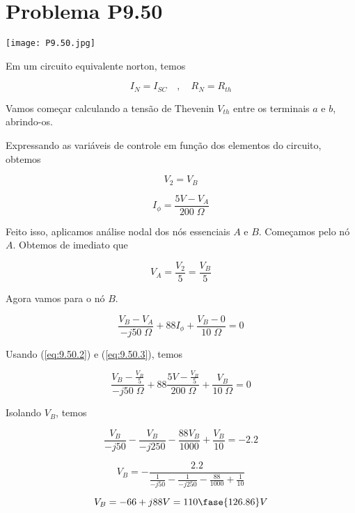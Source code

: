 \section*{Problema P9.50}

\renewcommand*\thesection{9.50}

\begin{center}
    \texttt{[image: P9.50.jpg]}
\end{center}

Em um circuito equivalente norton, temos

\[ I_N = I_{SC} \quad, \quad R_N = R_{th}  \]

Vamos começar calculando a tensão de Thevenin \(V_{th}\) entre os terminais \(a\) e \(b\), abrindo-os.

Expressando as variáveis de controle em função dos elementos do circuito, obtemos

\begin{equation}\label{eq:9.50.1}
    V_{2} = V_B
\end{equation}

\begin{equation}\label{eq:9.50.2}
    I_{\phi} = \frac{5V - V_A}{200 \;\Omega}
\end{equation}

Feito isso, aplicamos análise nodal dos nós essenciais \( A \) e \( B \).
Começamos pelo nó \( A \). Obtemos de imediato que

\begin{equation}\label{eq:9.50.3}
    V_{A} = \frac{V_2}{5} = \frac{V_B}{5}
\end{equation}

Agora vamos para o nó \( B \).

\[ \frac{V_B - V_A}{-j50 \;\Omega} + 88I_{\phi} + \frac{V_B - 0}{10 \;\Omega} = 0 \]

Usando (\ref{eq:9.50.2}) e (\ref{eq:9.50.3}), temos

\[ \frac{V_B - \frac{V_B}{5}}{-j50 \;\Omega} + 88\frac{5V - \frac{V_B}{5}}{200 \;\Omega} + \frac{V_B}{10 \;\Omega} = 0 \]

Isolando \( V_{B} \), temos

\[ \frac{V_B}{-j50} - \frac{V_B}{-j250} - \frac{88V_B}{1000} + \frac{V_B}{10} = - 2.2\]

\[ V_B = - \frac{2.2}{\frac{1}{-j50} - \frac{1}{-j250} - \frac{88}{1000} + \frac{1}{10}}\]

\begin{equation}\label{eq:9.50.4}
    V_{B} = - 66 + j88 V = 110\fase{126.86} V
\end{equation}

